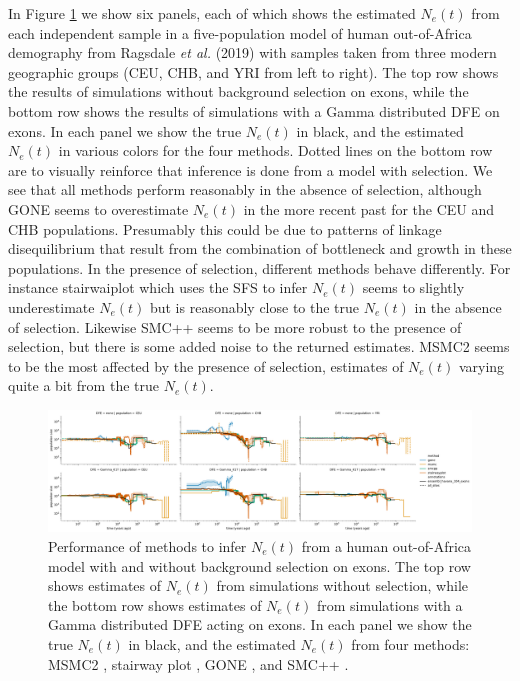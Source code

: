 \documentclass[hidelinks]{article}
\begin{document}
In Figure \ref{fig:1pop-human-demography} we show six panels, each of which shows the estimated $N_e(t)$
from each independent sample in a five-population model of human out-of-Africa demography
from Ragsdale \textit{et al.} (2019)
with samples taken from three modern geographic groups (CEU, CHB, and YRI from left to right).
The top row shows the results of simulations without background selection on exons, while the bottom row shows the results
of simulations with a Gamma distributed DFE on exons. In each panel we show the true $N_e(t)$ in black, and the estimated $N_e(t)$
in various colors for the four methods. Dotted lines on the bottom row are to visually reinforce that inference is done
from a model with selection.  We see that all methods perform reasonably in the absence of selection, 
although GONE seems to overestimate $N_e(t)$ in the more recent past for the CEU and CHB populations.
Presumably this could be due to patterns of linkage disequilibrium that result from the combination
of bottleneck and growth in these populations.
In the presence of selection, different methods behave differently. 
For instance stairwaiplot which uses the SFS to infer $N_e(t)$ seems to slightly underestimate $N_e(t)$
but is reasonably close to the true $N_e(t)$ in the absence of selection.
Likewise SMC++ seems to be more robust to the presence of selection,
but there is some added noise to the returned estimates. 
MSMC2 seems to be the most affected by the presence of selection, 
estimates of $N_e(t)$ varying quite a bit from the true $N_e(t)$.



\begin{figure}[t]
    \centering
    \includegraphics[width=\textwidth]{figures/HomSap/OOA/estimated_Ne_t_final}
    \caption{
    \label{fig:1pop-human-demography}
    Performance of methods to infer $N_e(t)$ from a human out-of-Africa model \citep{ragsdale2019models}
    with and without background selection on exons. The top row shows estimates of $N_e(t)$ from simulations
    without selection, while the bottom row shows estimates of $N_e(t)$ from simulations with a Gamma distributed   
    DFE acting on exons. In each panel we show the true $N_e(t)$ in black, and the estimated $N_e(t)$ from four methods:    
    MSMC2 \citep{Schiffels2020}, stairway plot \citep{liu2020stairway}, GONE \citep{santiago2020recent}, and SMC++ \citep{terhorst2017robust}.  
    }
\end{figure}
\end{document}
